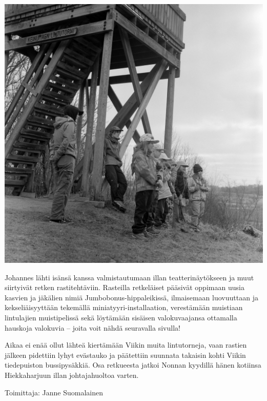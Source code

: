 \documentclass[10pt,finnish,a5paper,headings=small,twoside=semi]{scrartcl}
\begin{document}
\begin{multicols}{2}
	\columnbreak

	\vspace*{-0.32cm}
	\noindent\includegraphics[width=\linewidth]{assets/kolkkienpäiväretkibw15}

	Johannes lähti isänsä kanssa valmistautumaan illan teatterinäytökseen
	ja muut siirtyivät retken rastitehtäviin. Rasteilla retkeläiset
	pääsivät oppimaan uusia kasvien ja jäkälien nimiä
	Jumbobonus-hippaleikissä, ilmaisemaan luovuuttaan ja kekseliäisyyttään
	tekemällä miniatyyri-installaation, verestämään muistiaan lintulajien
	muistipelissä sekä löytämään sisäisen valokuvaajansa ottamalla hauskoja
	valokuvia – joita voit nähdä seuravalla sivulla!

	\columnbreak

	Aikaa ei enää ollut lähteä kiertämään Viikin muita lintutorneja, vaan
	rastien jälkeen pidettiin lyhyt evästauko ja päätettiin suunnata
	takaisin kohti Viikin tiedepuiston bussipysäkkiä. Osa retkueesta jatkoi
	Nonnan kyydillä hänen kotiinsa Hiekkaharjuun illan johtajahuoltoa
	varten.

	\vspace*{0.32cm}

	\raggedleft Toimittaja: Janne Suomalainen\\


\end{multicols}
\end{document}
